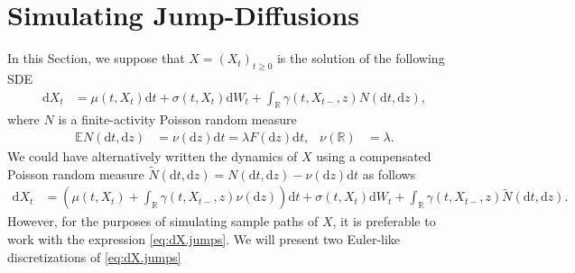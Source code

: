 \documentclass[12pt]{book}
\numberwithin{equation}{chapter}
\theoremstyle{plain}
\numberwithin{theorem}{section}
\theoremstyle{definition}
\numberwithin{exercise}{chapter}
\newcommand{\<}{\langle}
\renewcommand{\>}{\rangle}
\renewcommand{\(}{\left(}
\renewcommand{\)}{\right)}
\renewcommand{\[}{\left[}
\renewcommand{\]}{\right]}
\newcommand\Eb{\mathds{E}}
\newcommand\Rb{\mathds{R}}
\newcommand\sig{\sigma}
\newcommand\gam{\gamma}
\newcommand\lam{\lambda}
\newcommand\Nt{\widetilde{N}}
\newcommand\dd{\mathrm{d}}
\begin{document}
\section{Simulating Jump-Diffusions}
\label{sec:Gen.JD}
In this Section, we suppose that $X = (X_t)_{t \geq 0}$ is the solution of the following SDE
\begin{align}
\dd X_t
	&=	\mu(t,X_t) \dd t + \sig(t,X_t) \dd W_t + \int_\Rb \gam(t,X_{t-},z) N(\dd t, \dd z) , \label{eq:dX.jumps}
\end{align}
where $N$ is a finite-activity Poisson random measure
\begin{align}
\Eb N(\dd t, \dd z)
	&=	\nu(\dd z) \dd t = \lam F(\dd z) \dd t, &
\nu(\Rb)
	&=	\lam  .
\end{align}
We could have alternatively written the dynamics of $X$ using a compensated Poisson random measure $\Nt(\dd t, \dd z) = N(\dd t, \dd z) - \nu(\dd z) \dd t$ as follows
\begin{align}
\dd X_t
	&=	\( \mu(t,X_t) + \int_\Rb \gam(t,X_{t-},z) \nu(\dd z) \) \dd t + \sig(t,X_t) \dd W_t + \int_\Rb \gam(t,X_{t-},z) \Nt(\dd t, \dd z) .
\end{align}
However, for the purposes of simulating sample paths of $X$, it is preferable to work with the expression \eqref{eq:dX.jumps}.  We will present two Euler-like discretizations of \eqref{eq:dX.jumps}
\end{document}
